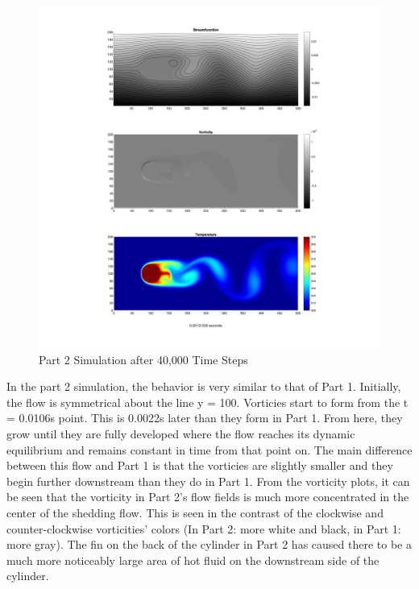 \begin{figure}[h]
\includegraphics[width=\linewidth]{images/Part-2-Final-Project-40000.png}
 \caption{Part 2 Simulation after 40,000 Time Steps}
\end{figure}

In the part 2 simulation, the behavior is very similar to that of Part 1. Initially, the flow is symmetrical about the line y = 100. Vorticies start to form from the t = 0.0106s point. This is 0.0022s later than they form in Part 1. From here, they grow until they are fully developed where the flow reaches its dynamic equilibrium and remains constant in time from that point on. The main difference between this flow and Part 1 is that the vorticies are slightly smaller and they begin further downstream than they do in Part 1. From the vorticity plots, it can be seen that the vorticity in Part 2's flow fields is much more concentrated in the center of the shedding flow. This is seen in the contrast of the clockwise and counter-clockwise vorticities' colors (In Part 2: more white and black, in Part 1: more gray). The fin on the back of the cylinder in Part 2 has caused there to be a much more noticeably large area of hot fluid on the downstream side of the cylinder. 

\clearpage 

